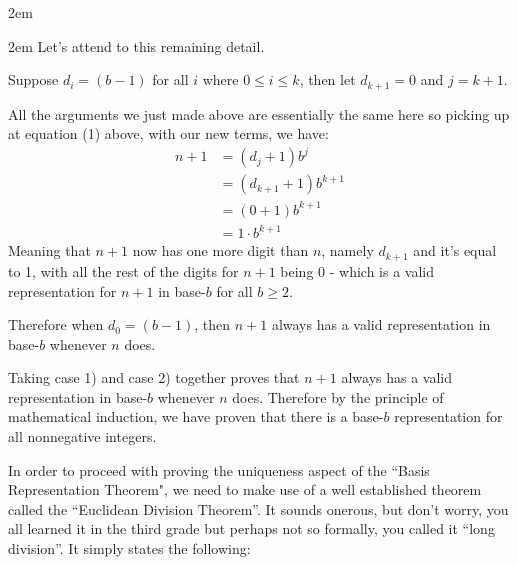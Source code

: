\documentclass{article}
\newenvironment{jprIn}{\begin{adjustwidth}{2em}{}}{\end{adjustwidth}}
\begin{document}
\begin{jprIn}
\begin{jprIn}
Let's attend to this remaining detail.

Suppose $d_i=(b-1)$ for all $i$ where $0\le{}i\le{}k$, then let $d_{k+1}=0$ and $j=k+1$.

All the arguments we just made above are essentially the same here so picking up at equation (1) above, with our new terms, we have:
\begin{align*}
n+1 &=(d_j+1)b^j\\
&=(d_{k+1}+1)b^{k+1}\\
&=(0+1)b^{k+1}\\
&=1\cdot{}b^{k+1}
\end{align*}
Meaning that $n+1$ now has one more digit than $n$, namely $d_{k+1}$ and it's equal to 1,
with all the rest of the digits for $n+1$ being 0 - which is a valid representation for $n+1$ in base-$b$ for all $b\ge2$.

Therefore when $d_0=(b-1)$, then $n+1$ always has a valid representation in base-$b$ whenever $n$ does.
\end{jprIn}
Taking case 1) and case 2) together proves that $n+1$ always has a valid representation in base-$b$ whenever $n$ does.
Therefore 
by the principle of mathematical induction,
we have proven that there is a base-$b$ representation for all nonnegative integers.
\end{jprIn}
\bigskip

In order to proceed
with proving the uniqueness aspect of the ``Basis Representation Theorem", we
need to make use of a well established theorem
called the ``Euclidean Division Theorem''.
It sounds onerous, but don't worry, you all learned it
in the third grade but perhaps not so formally, you called it ``long division''. It simply states the following:

\break
\end{document}
